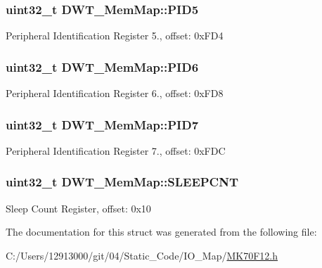 \subsubsection[{P\+I\+D5}]{\setlength{\rightskip}{0pt plus 5cm}uint32\+\_\+t D\+W\+T\+\_\+\+Mem\+Map\+::\+P\+I\+D5}\label{struct_d_w_t___mem_map_a8b21a1c5290151d5474deb51c391b85b}
Peripheral Identification Register 5., offset\+: 0x\+F\+D4 \hypertarget{struct_d_w_t___mem_map_a7c3faa2d806e506a32d9d3283e3717c2}{}
\subsubsection[{P\+I\+D6}]{\setlength{\rightskip}{0pt plus 5cm}uint32\+\_\+t D\+W\+T\+\_\+\+Mem\+Map\+::\+P\+I\+D6}\label{struct_d_w_t___mem_map_a7c3faa2d806e506a32d9d3283e3717c2}
Peripheral Identification Register 6., offset\+: 0x\+F\+D8 \hypertarget{struct_d_w_t___mem_map_af0158099ec07706eef6138a50643e1c8}{}
\subsubsection[{P\+I\+D7}]{\setlength{\rightskip}{0pt plus 5cm}uint32\+\_\+t D\+W\+T\+\_\+\+Mem\+Map\+::\+P\+I\+D7}\label{struct_d_w_t___mem_map_af0158099ec07706eef6138a50643e1c8}
Peripheral Identification Register 7., offset\+: 0x\+F\+D\+C \hypertarget{struct_d_w_t___mem_map_a0c31354b6fe3f3dd79bc5b768bea4f46}{}
\subsubsection[{S\+L\+E\+E\+P\+C\+N\+T}]{\setlength{\rightskip}{0pt plus 5cm}uint32\+\_\+t D\+W\+T\+\_\+\+Mem\+Map\+::\+S\+L\+E\+E\+P\+C\+N\+T}\label{struct_d_w_t___mem_map_a0c31354b6fe3f3dd79bc5b768bea4f46}
Sleep Count Register, offset\+: 0x10 

The documentation for this struct was generated from the following file\+:\begin{DoxyCompactItemize}
\item 
C\+:/\+Users/12913000/git/04/\+Static\+\_\+\+Code/\+I\+O\+\_\+\+Map/\hyperlink{_m_k70_f12_8h}{M\+K70\+F12.\+h}\end{DoxyCompactItemize}
